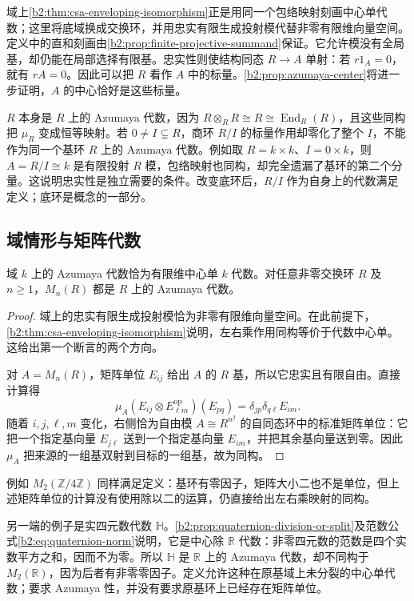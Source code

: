 域上\cref{b2:thm:csa-enveloping-isomorphism}正是用同一个包络映射刻画中心单代数；这里将底域换成交换环，并用忠实有限生成投射模代替非零有限维向量空间。定义中的直和刻画由\cref{b2:prop:finite-projective-summand}保证。它允许模没有全局基，却仍能在局部选择有限基。忠实性则使结构同态 \(R\rightarrow A\) 单射：若 \(r1_A=0\)，就有 \(rA=0\)。因此可以把 \(R\) 看作 \(A\) 中的标量。\cref{b2:prop:azumaya-center}将进一步证明，\(A\) 的中心恰好是这些标量。

\ProseParagraphBreak
\(R\) 本身是 \(R\) 上的 Azumaya 代数，因为 \(R\otimes_R R\cong R\cong\operatorname{End}_R(R)\)，且这些同构把 \(\mu_R\) 变成恒等映射。若 \(0\ne I\subsetneq R\)，商环 \(R/I\) 的标量作用却零化了整个 \(I\)，不能作为同一个基环 \(R\) 上的 Azumaya 代数。例如取 \(R=k\times k\)、\(I=0\times k\)，则 \(A=R/I\cong k\) 是有限投射 \(R\) 模，包络映射也同构，却完全遗漏了基环的第二个分量。这说明忠实性是独立需要的条件。改变底环后，\(R/I\) 作为自身上的代数满足定义；底环是概念的一部分。

\subsection{域情形与矩阵代数}
\label{b2:subsec:C01:02}

\begin{proposition}\label{b2:prop:azumaya-field-matrix}
	域 \(k\) 上的 Azumaya 代数恰为有限维中心单 \(k\) 代数。对任意非零交换环 \(R\) 及 \(n\ge1\)，\(M_n(R)\) 都是 \(R\) 上的 Azumaya 代数。
\end{proposition}
\begin{proof}
	域上的忠实有限生成投射模恰为非零有限维向量空间。在此前提下，\cref{b2:thm:csa-enveloping-isomorphism}说明，左右乘作用同构等价于代数中心单。这给出第一个断言的两个方向。

	对 \(A=M_n(R)\)，矩阵单位 \(E_{ij}\) 给出 \(A\) 的 \(R\) 基，所以它忠实且有限自由。直接计算得
	\[
		\mu_A(E_{ij}\otimes E_{\ell m}^{\mathrm{op}})(E_{pq}) =\delta_{jp}\delta_{q\ell}E_{im}.
	\]
	随着 \(i,j,\ell,m\) 变化，右侧恰为自由模 \(A\cong R^{n^2}\) 的自同态环中的标准矩阵单位：它把一个指定基向量 \(E_{j\ell}\) 送到一个指定基向量 \(E_{im}\)，并把其余基向量送到零。因此 \(\mu_A\) 把来源的一组基双射到目标的一组基，故为同构。
\end{proof}

例如 \(M_2(\mathbb Z/4\mathbb Z)\) 同样满足定义：基环有零因子，矩阵大小二也不是单位，但上述矩阵单位的计算没有使用除以二的运算，仍直接给出左右乘映射的同构。

\ProseParagraphBreak
另一端的例子是实四元数代数 \(\mathbb H\)。\cref{b2:prop:quaternion-division-or-split}及范数公式\eqref{b2:eq:quaternion-norm}说明，它是中心除 \(\mathbb R\) 代数：非零四元数的范数是四个实数平方之和，因而不为零。所以 \(\mathbb H\) 是 \(\mathbb R\) 上的 Azumaya 代数，却不同构于 \(M_2(\mathbb R)\)，因为后者有非零零因子。定义允许这种在原基域上未分裂的中心单代数；要求 Azumaya 性，并没有要求原基环上已经存在矩阵单位。
